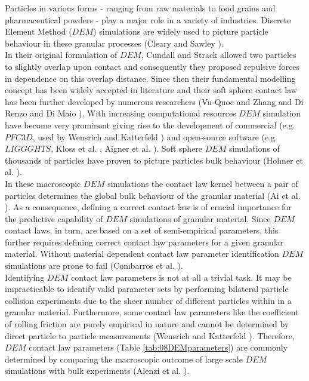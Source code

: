 \documentclass[review]{elsarticle}
\begin{document}
Particles in various forms - ranging from raw materials to food grains and pharmaceutical powders - 
play a major role in a variety of industries. 
Discrete Element Method ($DEM$) simulations are widely used to picture particle
behaviour in these granular processes (Cleary and Sawley \cite{RefWorks:130}).\\
In their original formulation of $DEM$, Cundall and Strack \cite{RefWorks:172} allowed two 
particles to slightly overlap upon contact and consequently they proposed repulsive forces in dependence on this overlap distance. 
Since then their fundamental modelling concept has been widely accepted in literature 
and their soft sphere contact law has been further developed by numerous researchers 
(Vu-Quoc and Zhang \cite{RefWorks:148} and Di Renzo and Di Maio \cite{RefWorks:145}). 
With increasing computational resources $DEM$ simulation have become very prominent 
giving rise to the development of commercial (e.g. $PFC3D$, used by Wensrich and
Katterfeld \cite{RefWorks:87}) and open-source software (e.g. $LIGGGHTS$, Kloss
et al. \cite{RefWorks:136}, Aigner et al. \cite{RefWorks:139}).
Soft sphere $DEM$ simulations of thousands of particles have proven to 
picture particles bulk behaviour (Hohner et al. \cite{RefWorks:86}). \\
In these macroscopic $DEM$ simulations the contact law kernel between a 
pair of particles determines the global bulk behaviour of the granular material (Ai et al. \cite{RefWorks:131}). 
As a consequence, defining a correct contact law is of crucial importance for the predictive 
capability of $DEM$ simulations of granular material. 
Since $DEM$ contact laws, in turn, are based 
on a set of semi-empirical parameters, this further requires defining correct contact law 
parameters for a given granular material. 
Without material dependent contact law parameter identification $DEM$ simulations are prone to fail (Combarros et al. \cite{RefWorks:177}). \\
Identifying $DEM$ contact law parameters is not at all a trivial task. 
It may be impracticable to identify valid parameter sets by performing bilateral 
particle collision experiments due to the sheer number of different particles within in a granular material. 
Furthermore, some contact law parameters like the coefficient of rolling
friction are purely empirical in nature and cannot be determined by direct 
particle to particle measurements (Wensrich and Katterfeld \cite{RefWorks:87}).
Therefore, $DEM$ contact law parameters (Table \ref{tab:08DEMparameters}) are
commonly determined by comparing the macroscopic outcome of large scale $DEM$ simulations with bulk experiments (Alenzi et al. \cite{RefWorks:91}). 
\end{document}
